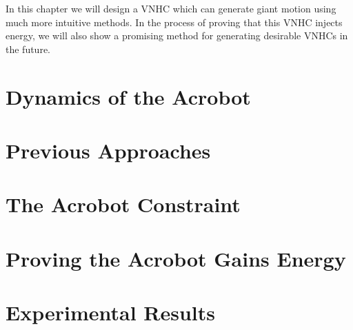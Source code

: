 In this chapter we will design a VNHC which can generate giant motion using much
more intuitive methods. In the process of proving that this VNHC injects energy,
we will also show a promising method for generating desirable VNHCs in the
future.

\section{Dynamics of the Acrobot}
\section{Previous Approaches}

\section{The Acrobot Constraint}
\section{Proving the Acrobot Gains Energy}

\section{Experimental Results}




























